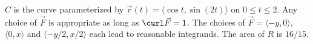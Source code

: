 {$C$ is the curve parameterized by $\vec r(t) = \langle \cos t,\sin (2t)\rangle$ on $0\leq t\leq 2$. 
}
{Any choice of $\vec F$ is appropriate as long as $\curl \vec F = 1$. The choices of  $\vec F = \langle -y,0\rangle$, $\langle 0,x\rangle$ and $\langle -y/2,x/2\rangle$ each lead to reasonable integrands. The area of $R$ is $16/15$.
}
